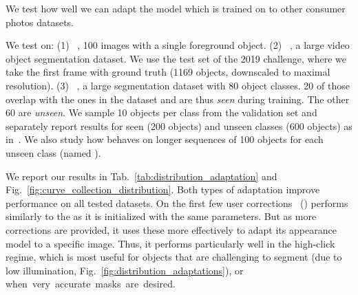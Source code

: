\label{sec:in_domain_adaptation}
We test how well we can adapt the model which is trained on \pascal{} to other consumer photos datasets.

We test on: (1) \emph{\berkeley{}}~\cite{mcguinness10book}, 100 images with a single foreground object.
(2) \emph{\youtubeVOS{}}~\cite{xu18arxiv}, a large video object segmentation dataset.
We use the test set of the 2019 challenge, where we take the first frame with ground truth (1169 objects, downscaled to  maximal resolution).
(3) \emph{\coco{}}~\cite{lin14eccv}, a large segmentation dataset with 80 object classes.
20 of those overlap with the ones in the \pascal{} dataset and are thus \emph{seen} during training. The other 60 are \emph{unseen}.
We sample 10 objects
per class from the validation set and separately report results for seen (200 objects) and unseen classes (600 objects) as in~\cite{xu16cvpr,majumder19cvpr}.
We also study how \datasetSGD{} behaves on longer sequences of 100 objects for each unseen class (named {\em \cocounseenlarge{}}).

We report our results in Tab.~\ref{tab:distribution_adaptation} and Fig.~\ref{fig:curve_collection_distribution}.
Both types of adaptation
improve performance on all tested datasets.
On the first few user corrections \textit{\imageSGD{}}~(\imageadaptationshort{}) performs similarly to the \fixedmodellong{} as it is initialized with the same parameters. But as more corrections are provided, it uses these more effectively to adapt its appearance model to a specific image.
Thus, it performs particularly well in the high-click regime,
which is most useful for objects that are challenging to segment (\eg due to low illumination, Fig.~\ref{fig:distribution_adaptations}),
or when~very~accurate~masks~are~desired.

